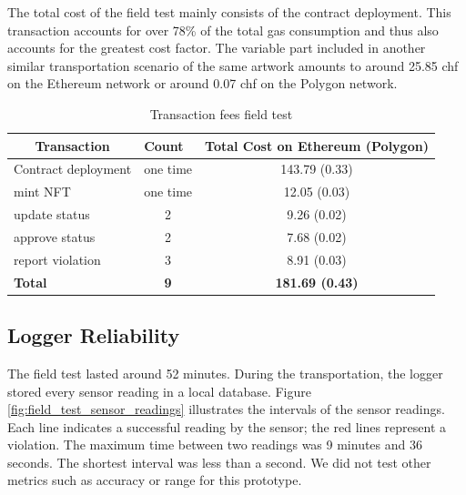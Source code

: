 The total cost of the field test mainly consists of the contract deployment. This transaction accounts for over 78\% of the total gas consumption and thus also accounts for the greatest cost factor. The variable part included in another similar transportation scenario of the same artwork amounts to around 25.85 \gls{chf} on the Ethereum network or around 0.07 \gls{chf} on the Polygon network.

\begin{table}[ht]
\centering
\begin{tabular}{lcc}
\multicolumn{1}{c}{\textbf{Transaction}} & \multicolumn{1}{l}{\textbf{Count}} & \multicolumn{1}{c}{\textbf{Total Cost on Ethereum (Polygon)}} \\ \hline
Contract deployment                      & one time                           & 143.79 (0.33)          \\
mint NFT                                 & one time                           & 12.05 (0.03)           \\
update status                            & 2                                  & 9.26 (0.02)            \\
approve status                           & 2                                  & 7.68 (0.02)            \\
report violation                         & 3                                  & 8.91 (0.03)            \\ \hline
\textbf{Total}                           & \textbf{9}                         & \textbf{181.69 (0.43)} \\
\hline
\end{tabular}
\caption{Transaction fees field test}
\label{tab:field_test_tx_fees}
\end{table}
\vspace{-0.5cm}
\subsection{Logger Reliability}
The field test lasted around 52 minutes. During the transportation, the logger stored every sensor reading in a local database. Figure \ref{fig:field_test_sensor_readings} illustrates the intervals of the sensor readings. Each line indicates a successful reading by the sensor; the red lines represent a violation. The maximum time between two readings was 9 minutes and 36 seconds. The shortest interval was less than a second. We did not test other metrics such as accuracy or range for this prototype.

